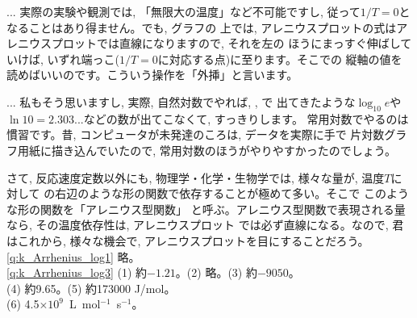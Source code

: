 
\begin{faq}{\small{} ... 実際の実験や観測では, 
「無限大の温度」など不可能ですし, 従って$1/T=0$となることはあり得ません。でも, グラフの
上では, アレニウスプロットの式はアレニウスプロットでは直線になりますので, それを左の
ほうにまっすぐ伸ばしていけば, いずれ端っこ($1/T=0$に対応する点)に至ります。そこでの
縦軸の値を読めばいいのです。こういう操作を「外挿」と言います。}\end{faq}

\begin{faq}{\small{} ... 私もそう思いますし, 
実際, 自然対数でやれば, , で
出てきたような$\log_{10}e$や$\ln 10=2.303...$などの数が出てこなくて, すっきりします。
常用対数でやるのは慣習です。昔, コンピュータが未発達のころは, データを実際に手で
片対数グラフ用紙に描き込んでいたので, 常用対数のほうがやりやすかったのでしょう。}\end{faq}

さて, 反応速度定数以外にも, 物理学・化学・生物学では, 様々な量が, 温度$T$に対して
の右辺のような形の関数で依存することが極めて多い。そこで
このような形の関数を「アレニウス型関数」
と呼ぶ。アレニウス型関数で表現される量なら, その温度依存性は, アレニウスプロット
では必ず直線になる。なので, 君はこれから, 様々な機会で, アレニウスプロットを目にすることだろう。\\


\ref{q:k_Arrhenius_log1} 略。\\

\ref{q:k_Arrhenius_log3} (1) 約$-1.21$。(2) 略。(3) 約$-9050$。\\
(4) 約9.65。(5) 約173000 J/mol。\\
(6) 4.5$\times10^9$~L~mol$^{-1}$~s$^{-1}$。
\vv












